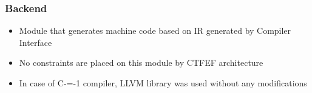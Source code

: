 \begin{frame}
    \frametitle{Backend}

    \begin{itemize}
        \item Module that generates machine code based on IR generated by Compiler Interface
        \item No constraints are placed on this module by CTFEF architecture
        \item In case of C-=-1 compiler, LLVM library was used without any modifications
    \end{itemize}

\end{frame}
